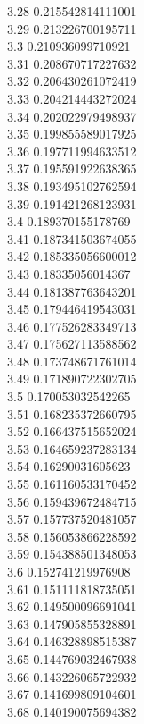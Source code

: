 {3.28	0.215542814111001\\
3.29	0.213226700195711\\
3.3	0.210936099710921\\
3.31	0.208670717227632\\
3.32	0.206430261072419\\
3.33	0.204214443272024\\
3.34	0.202022979498937\\
3.35	0.199855589017925\\
3.36	0.197711994633512\\
3.37	0.195591922638365\\
3.38	0.193495102762594\\
3.39	0.191421268123931\\
3.4	0.189370155178769\\
3.41	0.187341503674055\\
3.42	0.185335056600012\\
3.43	0.18335056014367\\
3.44	0.181387763643201\\
3.45	0.179446419543031\\
3.46	0.177526283349713\\
3.47	0.175627113588562\\
3.48	0.173748671761014\\
3.49	0.171890722302705\\
3.5	0.170053032542265\\
3.51	0.168235372660795\\
3.52	0.166437515652024\\
3.53	0.164659237283134\\
3.54	0.16290031605623\\
3.55	0.161160533170452\\
3.56	0.159439672484715\\
3.57	0.157737520481057\\
3.58	0.156053866228592\\
3.59	0.154388501348053\\
3.6	0.152741219976908\\
3.61	0.151111818735051\\
3.62	0.149500096691041\\
3.63	0.147905855328891\\
3.64	0.146328898515387\\
3.65	0.144769032467938\\
3.66	0.143226065722932\\
3.67	0.141699809104601\\
3.68	0.140190075694382\\
}
